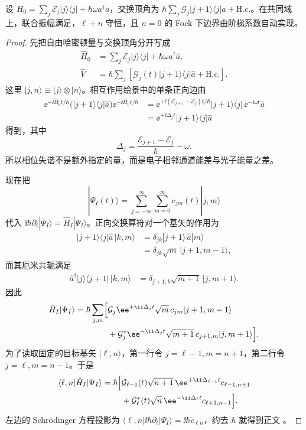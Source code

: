 \begin{proposition}[单模交换格的振幅与守恒扇区]
设 $H_0=\sum_j\mathcal E_j|j\rangle\langle j|+\hbar\omega a^\dagger a$，交换顶角为 $\hbar\sum_j\mathcal G_j|j+1\rangle\langle j|a+\mathrm{H.c.}$。在共同域上，联合振幅满足，$\ell+n$ 守恒，且 $n=0$ 的 Fock 下边界由阶梯系数自动实现。
\end{proposition}
\begin{proof}
先把自由哈密顿量与交换顶角分开写成
\begin{align*}
 \hat H_0
 &=\sum_j\mathcal E_j|j\rangle\langle j|
   +\hbar\omega\hat a^\dagger\hat a,\\
 \hat V
 &=\hbar\sum_j\left[
 \mathcal G_j(t)|j+1\rangle\langle j|\hat a+\mathrm{H.c.}\right].
\end{align*}
这里 $|j,n\rangle\equiv|j\rangle\otimes|n\rangle$。相互作用绘景中的单条正向边由
\begin{align*}
 \ee^{+\ii\hat H_0t/\hbar}
 \bigl(|j+1\rangle\langle j|\hat a\bigr)
 \ee^{-\ii\hat H_0t/\hbar}
 &={}
 \ee^{+\ii(\mathcal E_{j+1}-\mathcal E_j)t/\hbar}
 |j+1\rangle\langle j|\,
 \ee^{-\ii\omega t}\hat a\\
 &=\ee^{+\ii\Delta_jt}|j+1\rangle\langle j|\hat a
\end{align*}
得到，其中
\[
 \Delta_j=\frac{\mathcal E_{j+1}-\mathcal E_j}{\hbar}-\omega.
\]
所以相位失谐不是额外指定的量，而是电子相邻通道能差与光子能量之差。

现在把
\[
 |\Psi_I(t)\rangle=\sum_{j= -\infty}^{\infty}\sum_{m=0}^{\infty}
 c_{jm}(t)|j,m\rangle
\]
代入 $\ii\hbar\partial_t|\Psi_I\rangle=\hat H_I|\Psi_I\rangle$。正向交换算符对一个基矢的作用为
\begin{align*}
 |j+1\rangle\langle j|\hat a\,|k,m\rangle
 &=\delta_{jk}|j+1\rangle\,\hat a|m\rangle\\
 &=\delta_{jk}\sqrt m\,|j+1,m-1\rangle,
\end{align*}
而其厄米共轭满足
\begin{align*}
 \hat a^\dagger|j\rangle\langle j+1|\,|k,m\rangle
 &=\delta_{j+1,k}\sqrt{m+1}\,|j,m+1\rangle.
\end{align*}
因此
\begin{align*}
 \hat H_I|\Psi_I\rangle
 =\hbar\sum_{j,m}\Bigl[&
 \mathcal G_j\ee^{+\ii\Delta_jt}\sqrt m\,c_{jm}
 |j+1,m-1\rangle\\
 &+\mathcal G_j^*\ee^{-\ii\Delta_jt}\sqrt{m+1}\,c_{j+1,m}
 |j,m+1\rangle\Bigr].
\end{align*}
为了读取固定的目标基矢 $|\ell,n\rangle$，第一行令 $j=\ell-1,m=n+1$，第二行令 $j=\ell,m=n-1$。于是
\begin{align*}
 \langle\ell,n|\hat H_I|\Psi_I\rangle
 =\hbar\Bigl[&
 \mathcal G_{\ell-1}(t)\sqrt{n+1}\,
 \ee^{+\ii\Delta_{\ell-1}t}c_{\ell-1,n+1}\\
 &+\mathcal G_\ell^*(t)\sqrt n\,
 \ee^{-\ii\Delta_\ell t}c_{\ell+1,n-1}\Bigr].
\end{align*}
左边的 Schr\"odinger 方程投影为
$\langle\ell,n|\ii\hbar\partial_t|\Psi_I\rangle
=\ii\hbar\dot c_{\ell n}$，约去 $\hbar$ 就得到正文
。


\end{proof}
